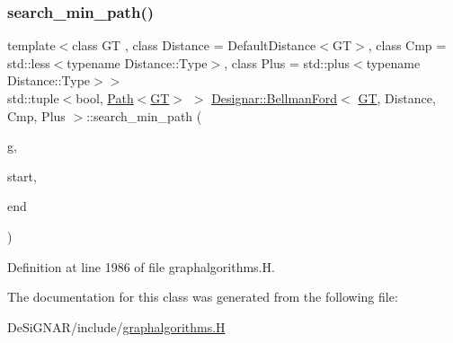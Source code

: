 \subsubsection{\texorpdfstring{search\+\_\+min\+\_\+path()}{search\_min\_path()}}
{\footnotesize\ttfamily template$<$class GT , class Distance  = Default\+Distance$<$\+G\+T$>$, class Cmp  = std\+::less$<$typename Distance\+::\+Type$>$, class Plus  = std\+::plus$<$typename Distance\+::\+Type$>$$>$ \\
std\+::tuple$<$bool, \hyperlink{class_designar_1_1_path}{Path}$<$\hyperlink{demo-buildgraph_8_c_a3001c40d2c31ca87ed96cd7d1334a55e}{GT}$>$ $>$ \hyperlink{class_designar_1_1_bellman_ford}{Designar\+::\+Bellman\+Ford}$<$ \hyperlink{demo-buildgraph_8_c_a3001c40d2c31ca87ed96cd7d1334a55e}{GT}, Distance, Cmp, Plus $>$\+::search\+\_\+min\+\_\+path (\begin{DoxyParamCaption}\item[{\hyperlink{demo-buildgraph_8_c_a3001c40d2c31ca87ed96cd7d1334a55e}{GT} \&}]{g,  }\item[{Node \&}]{start,  }\item[{Node \&}]{end }\end{DoxyParamCaption})\hspace{0.3cm}{\ttfamily [inline]}}



Definition at line 1986 of file graphalgorithms.\+H.



The documentation for this class was generated from the following file\+:\begin{DoxyCompactItemize}
\item 
De\+Si\+G\+N\+A\+R/include/\hyperlink{graphalgorithms_8_h}{graphalgorithms.\+H}\end{DoxyCompactItemize}

